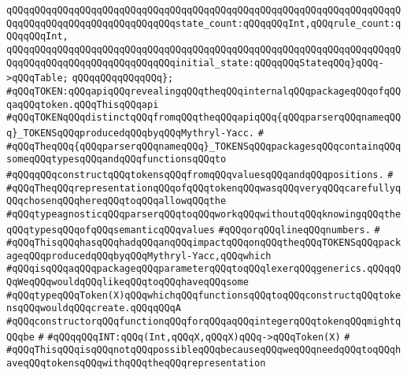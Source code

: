 \verb|qQQqqQQqqQQqqQQqqQQqqQQqqQQqqQQqqQQqqQQqqQQqqQQqqQQqqQQqqQQqqQQqqQQqqQQqqQQqqQQqqQQqqQQqqQQqqQQqqQQqstate_count:qQQqqQQqInt,qQQqrule_count:qQQqqQQqInt,|\newline
\verb|qQQqqQQqqQQqqQQqqQQqqQQqqQQqqQQqqQQqqQQqqQQqqQQqqQQqqQQqqQQqqQQqqQQqqQQqqQQqqQQqqQQqqQQqqQQqqQQqqQQqinitial_state:qQQqqQQqStateqQQq}qQQq->qQQqTable;|\newline
\verb|qQQqqQQqqQQqqQQq};|\newline
\newline
\verb|#qQQqTOKEN:qQQqapiqQQqrevealingqQQqtheqQQqinternalqQQqpackageqQQqofqQQqaqQQqtoken.qQQqThisqQQqapi|\newline
\verb|#qQQqTOKENqQQqdistinctqQQqfromqQQqtheqQQqapiqQQq{qQQqparserqQQqnameqQQq}_TOKENSqQQqproducedqQQqbyqQQqMythryl-Yacc.|\newline
\verb|#|\newline
\verb|#qQQqTheqQQq{qQQqparserqQQqnameqQQq}_TOKENSqQQqpackagesqQQqcontainqQQqsomeqQQqtypesqQQqandqQQqfunctionsqQQqto|\newline
\verb|#qQQqqQQqconstructqQQqtokensqQQqfromqQQqvaluesqQQqandqQQqpositions.|\newline
\verb|#|\newline
\verb|#qQQqTheqQQqrepresentationqQQqofqQQqtokenqQQqwasqQQqveryqQQqcarefullyqQQqchosenqQQqhereqQQqtoqQQqallowqQQqthe|\newline
\verb|#qQQqtypeagnosticqQQqparserqQQqtoqQQqworkqQQqwithoutqQQqknowingqQQqtheqQQqtypesqQQqofqQQqsemanticqQQqvalues|\newline
\verb|#qQQqorqQQqlineqQQqnumbers.|\newline
\verb|#|\newline
\verb|#qQQqThisqQQqhasqQQqhadqQQqanqQQqimpactqQQqonqQQqtheqQQqTOKENSqQQqpackageqQQqproducedqQQqbyqQQqMythryl-Yacc,qQQqwhich|\newline
\verb|#qQQqisqQQqaqQQqpackageqQQqparameterqQQqtoqQQqlexerqQQqgenerics.qQQqqQQqWeqQQqwouldqQQqlikeqQQqtoqQQqhaveqQQqsome|\newline
\verb|#qQQqtypeqQQqToken(X)qQQqwhichqQQqfunctionsqQQqtoqQQqconstructqQQqtokensqQQqwouldqQQqcreate.qQQqqQQqA|\newline
\verb|#qQQqconstructorqQQqfunctionqQQqforqQQqaqQQqintegerqQQqtokenqQQqmightqQQqbe|\newline
\verb|#|\newline
\verb|#qQQqqQQqINT:qQQq(Int,qQQqX,qQQqX)qQQq->qQQqToken(X)|\newline
\verb|#|\newline
\verb|#qQQqThisqQQqisqQQqnotqQQqpossibleqQQqbecauseqQQqweqQQqneedqQQqtoqQQqhaveqQQqtokensqQQqwithqQQqtheqQQqrepresentation|\newline
